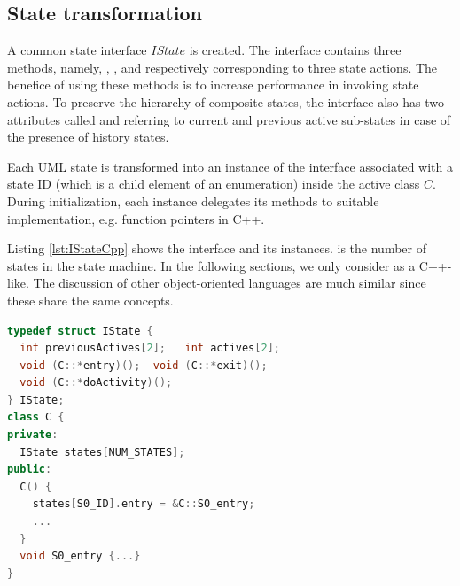 \subsection{State transformation}

A common state interface $IState$ is created. The interface contains three methods, namely, , , and  respectively corresponding to three state actions. The benefice of using these methods is to increase performance in invoking state actions. To preserve the hierarchy of composite states, the interface also has two attributes called  and  referring to current and previous active sub-states in case of the presence of history states.

Each UML state is transformed into an instance of the interface associated with a state ID (which is a child element of an enumeration) inside the active class $C$. 
During initialization, each instance delegates its methods to suitable implementation, e.g. function pointers in C++. 

Listing \ref{lst:IStateCpp} shows the interface and its instances. 
 is the number of states in the state machine. 
In the following sections, 
we only consider  as a C++-like. The discussion of other object-oriented languages are much similar since these share the same concepts.


\begin{lstlisting}[caption=IState interface and function pointers in C++, label=lst:IStateCpp, language=C++]
typedef struct IState {
  int previousActives[2];   int actives[2];
  void (C::*entry)();  void (C::*exit)();  
  void (C::*doActivity)();
} IState;
class C {
private:
  IState states[NUM_STATES];
public:
  C() {
    states[S0_ID].entry = &C::S0_entry;
    ...
  }
  void S0_entry {...}
}
\end{lstlisting}

